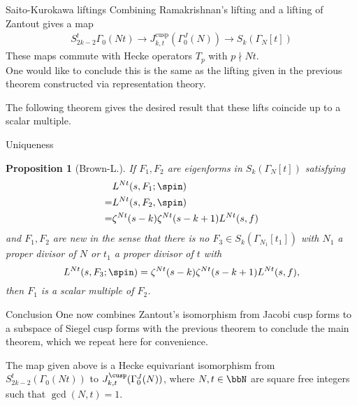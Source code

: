 \documentclass[mathserif,12pt]{beamer}
\newtheorem{proposition}[theorem]{Proposition}
\begin{document}
\begin{frame}{Saito-Kurokawa liftings}
Combining Ramakrishnan's lifting and a lifting of Zantout gives a map
\begin{align*}
S_{2k - 2}^t{\Gamma_0(Nt)} \rightarrow J_{k, t}^{\text{cusp}}(\Gamma_0^J(N)) \rightarrow S_k(\Gamma_N[t])
\end{align*}
These maps commute with Hecke operators $T_p$ with $p \nmid Nt$. \\[0.2in]

\pause 
One would like to conclude this is the same as the lifting given in the previous theorem constructed via representation theory.\\[0.2in] \pause

The following theorem gives the desired result that these lifts coincide up to a scalar multiple.
\end{frame}


\begin{frame}{Uniqueness}
\begin{proposition}[Brown-L.]
If $F_1, F_2$ are eigenforms in $S_k(\Gamma_{N}[t])$ satisfying
\begin{align*}
&L^{Nt}(s,F_1;\spin) \\
=& L^{Nt}(s,F_2,\spin) \\
=& \zeta^{Nt}(s-k) \zeta^{Nt}(s-k+1) L^{Nt}(s,f)
\end{align*}
and $F_1,F_2$ are new in the sense that there is no $F_3 \in S_k(\Gamma_{N_1}[t_1])$ with $N_1$ a proper divisor of $N$ or $t_1$ a proper divisor of
$t$ with
\begin{equation*}
L^{Nt}(s,F_3;\spin) = \zeta^{Nt}(s-k) \zeta^{Nt}(s-k+1) L^{Nt}(s,f),
\end{equation*}
then $F_1$ is a scalar multiple of $F_2$.
\end{proposition}
\end{frame}

\begin{frame}{Conclusion}
One now combines Zantout's isomorphism from Jacobi cusp forms to a subspace of Siegel cusp forms with the previous theorem to conclude the main theorem, which we repeat here for convenience. \\[0.2in]
\pause
\begin{theorem}[Brown-L.]
The map given above is a Hecke equivariant isomorphism from $S_{2k - 2}^{t}(\Gamma_0(Nt))$ to $J_{k,t}^{\cusp}(\Gamma_0^{J}(N))$,
where $N, t \in \bbN$ are square free integers such that $\gcd(N, t) = 1$.

\end{theorem}

\end{frame}
\end{document}
